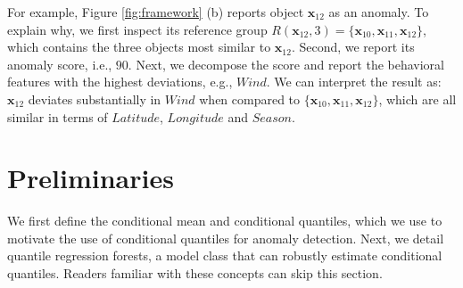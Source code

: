 \documentclass[pdflatex,sn-basic]{sn-jnl}%
\theoremstyle{thmstyleone}%
\theoremstyle{thmstyletwo}%
\theoremstyle{thmstylethree}%
\begin{document}
For example, Figure \ref{fig:framework} (b) reports object $\mathbf{x}_{12}$ as an anomaly. To explain why, we first inspect its reference group $R(\mathbf{x}_{12},3)=\{\mathbf{x}_{10},\mathbf{x}_{11},\mathbf{x}_{12}\}$, which contains the three objects most similar to $\mathbf{x}_{12}$. Second, we report its anomaly score, i.e., $90$. Next, we decompose the score and report the behavioral features with the highest deviations, e.g., $Wind$. We can interpret the result as: $\mathbf{x}_{12}$ deviates substantially in $Wind$ when compared to  $\{\mathbf{x}_{10},\mathbf{x}_{11},\mathbf{x}_{12}\}$, which are all similar in terms of $Latitude$, $Longitude$ and $Season$.

\section{Preliminaries}
\label{sec:prelim}

We first define the conditional mean and conditional quantiles, which we use to motivate the use of conditional quantiles for anomaly detection. Next, we detail quantile regression forests, a model class that can robustly estimate conditional quantiles. Readers familiar with these concepts can skip this section.
\end{document}

